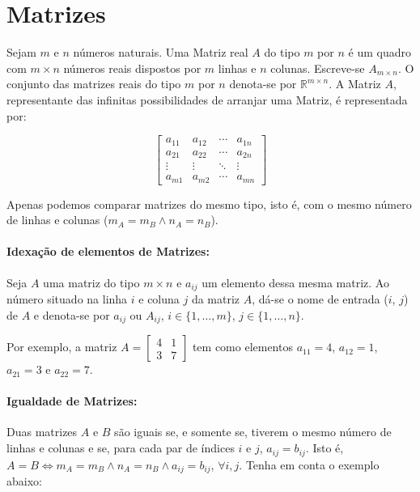 \section{Matrizes}
\indent

Sejam $m$ e $n$ números naturais. Uma Matriz real $A$ do tipo $m$ por $n$ é um
quadro com $m \times n$ números reais dispostos por $m$ linhas e $n$ colunas.
Escreve-se $A_{m \times n}$. O conjunto das matrizes reais do tipo $m$ por $n$
denota-se por $\mathbb{R}^{m \times n}$. A Matriz $A$, representante das
infinitas possibilidades de arranjar uma Matriz, é representada por:

\[
    \begin{bmatrix}
        a_{11} & a_{12} & \cdots & a_{1n} \\
        a_{21} & a_{22} & \cdots & a_{2n} \\
        \vdots & \vdots & \ddots & \vdots \\
        a_{m1} & a_{m2} & \cdots & a_{mn}
    \end{bmatrix}
\]

\begin{tcolorbox}
    Apenas podemos comparar matrizes do mesmo tipo, isto é, com o mesmo número de linhas e colunas ($m_A = m_B \wedge n_A = n_B$).
\end{tcolorbox}

\paragraph{Idexação de elementos de Matrizes:} Seja $A$ uma matriz do tipo $m \times n$ e $a_{ij}$ um elemento dessa mesma
matriz. Ao número situado na linha $i$ e coluna $j$ da matriz $A$, dá-se o nome
de entrada ($i$, $j$) de $A$ e denota-se por $a_{ij}$ ou $A_{ij}$, $i \in \{1,
    \dots , m\}$, $j \in \{1, \dots , n\}$.

Por exemplo, a matriz $A = \begin{bmatrix}
        4 & 1 \\
        3 & 7
    \end{bmatrix}$ tem como elementos $a_{11} = 4$, $a_{12} = 1$, $a_{21} = 3$ e $a_{22} = 7$.

\paragraph{Igualdade de Matrizes:} Duas matrizes $A$ e $B$ são iguais se, e somente se, tiverem o mesmo número de
linhas e colunas e se, para cada par de índices $i$ e $j$, $a_{ij} = b_{ij}$.
Isto é, $A = B \Leftrightarrow m_A = m_B \wedge n_A = n_B \wedge a_{ij} =
    b_{ij}$, $\forall i,j$. Tenha em conta o exemplo abaixo:

